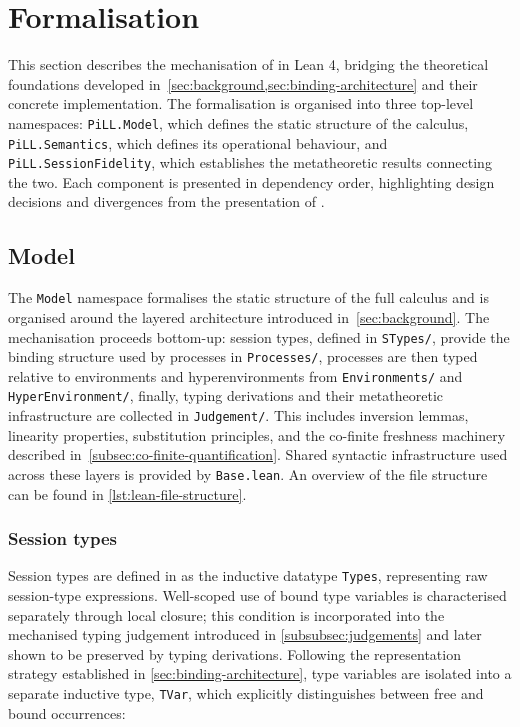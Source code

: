 \section{Formalisation}\label{sec:formalisation}
This section describes the mechanisation of \pill{} in Lean 4, bridging the theoretical foundations developed in~\cref{sec:background,sec:binding-architecture} and their concrete implementation. The formalisation is organised into three top-level namespaces: \texttt{PiLL.Model}, which defines the static structure of the calculus, \texttt{PiLL.Semantics}, which defines its operational behaviour, and \texttt{PiLL.SessionFidelity}, which establishes the metatheoretic results connecting the two. Each component is presented in dependency order, highlighting design decisions and divergences from the presentation of \citet{abs-2106-11818}.

\subsection{Model}\label{subsec:model}
The \texttt{Model} namespace formalises the static structure of the full \pill{} calculus and is organised around the layered architecture introduced in~\cref{sec:background}. The mechanisation proceeds bottom-up: session types, defined in \texttt{STypes/}, provide the binding structure used by processes in \texttt{Processes/}, processes are then typed relative to environments and hyperenvironments from \texttt{Environments/} and \texttt{HyperEnvironment/}, finally, typing derivations and their metatheoretic infrastructure are collected in \texttt{Judgement/}. This includes inversion lemmas, linearity properties, substitution principles, and the co-finite freshness machinery described in~\cref{subsec:co-finite-quantification}. Shared syntactic infrastructure used across these layers is provided by \texttt{Base.lean}. An overview of the file structure can be found in \cref{lst:lean-file-structure}.

\subsubsection{Session types}\label{subsubsec:stypes}
Session types are defined in  as the inductive datatype \texttt{Types}, representing raw session-type expressions. Well-scoped use of bound type variables is characterised separately through local closure; this condition is incorporated into the mechanised typing judgement introduced in \cref{subsubsec:judgements} and later shown to be preserved by typing derivations. Following the representation strategy established in \cref{sec:binding-architecture}, type variables are isolated into a separate inductive type, \texttt{TVar}, which explicitly distinguishes between free and bound occurrences:

